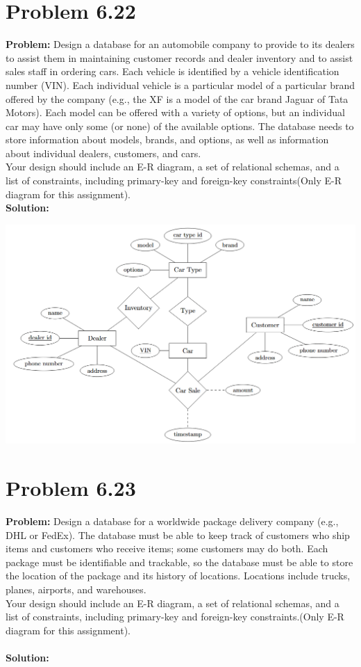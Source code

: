 \documentclass[12pt,a4paper]{article}
\begin{document}
\section*{Problem 6.22}

\textbf{Problem:} Design a database for an automobile company to provide to its dealers to assist them in maintaining customer records and dealer inventory and to assist sales staff in ordering cars. Each vehicle is identified by a vehicle identification number (VIN). Each individual vehicle is a particular model of a particular brand offered by the company (e.g., the XF is a model of the car brand Jaguar of Tata Motors). Each model can be offered with a variety of options, but an individual car may have only some (or none) of the available options. The database needs to store information about models, brands, and options, as well as information about individual dealers, customers, and cars.\\
Your design should include an E-R diagram, a set of relational schemas, and a list of constraints, including primary-key and foreign-key constraints(Only E-R diagram for this assignment).\\

\textbf{Solution:}

\begin{center}
\includegraphics[width=1\textwidth]{6.22.png}
\end{center}

\section*{Problem 6.23}

\textbf{Problem:} Design a database for a worldwide package delivery company (e.g., DHL or FedEx). The database must be able to keep track of customers who ship items and customers who receive items; some customers may do both. Each package must be identifiable and trackable, so the database must be able to store the location of the package and its history of locations. Locations include trucks, planes, airports, and warehouses.\\
Your design should include an E-R diagram, a set of relational schemas, and a list of constraints, including primary-key and foreign-key constraints.(Only E-R diagram for this assignment).\\ \\
\textbf{Solution:}
\end{document}
